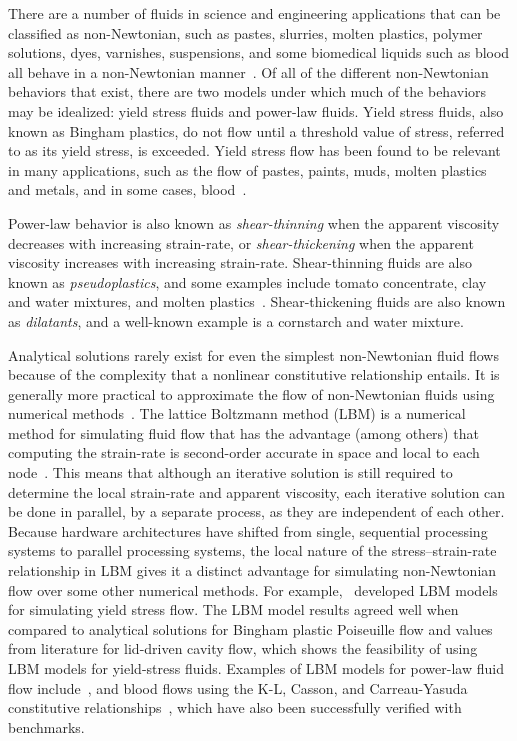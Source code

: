 There are a number of fluids in science and engineering applications that can be classified as non-Newtonian, such as pastes, slurries, molten plastics, polymer solutions, dyes, varnishes, suspensions, and some biomedical liquids such as blood all behave in a non-Newtonian manner~\cite{bohme1987non}.
Of all of the different non-Newtonian behaviors that exist, there are two models under which much of the behaviors may be idealized: yield stress fluids and power-law fluids.
Yield stress fluids, also known as Bingham plastics, do not flow until a threshold value of stress, referred to as its yield stress, is exceeded.
Yield stress flow has been found to be relevant in many applications, such as the flow of pastes, paints, muds, molten plastics and metals, and in some cases, blood~\cite{wang2011lattice}.

Power-law behavior is also known as \emph{shear-thinning} when the apparent viscosity decreases with increasing strain-rate, or \emph{shear-thickening} when the apparent viscosity increases with increasing strain-rate.
Shear-thinning fluids are also known as \emph{pseudoplastics}, and some examples include tomato concentrate, clay and water mixtures, and molten plastics~\cite{irgens2014rheology}.
Shear-thickening fluids are also known as \emph{dilatants}, and a well-known example is a cornstarch and water mixture.

\label{sec:lbm-for-nnf}

Analytical solutions rarely exist for even the simplest non-Newtonian fluid flows because of the complexity that a nonlinear constitutive relationship entails.
It is generally more practical to approximate the flow of non-Newtonian fluids using numerical methods~\cite{syrakos2014performance,owens2002computational,chai2011multiple}.
The lattice Boltzmann method (LBM) is a numerical method for simulating fluid flow that has the advantage (among others) that computing the strain-rate is second-order accurate in space and local to each node~\cite{kruger2010second}.
This means that although an iterative solution is still required to determine the local strain-rate and apparent viscosity, each iterative solution can be done in parallel, by a separate process, as they are independent of each other.
Because hardware architectures have shifted from single, sequential processing systems to parallel processing systems, the local nature of the stress--strain-rate relationship in LBM gives it a distinct advantage for simulating non-Newtonian flow over some other numerical methods.
For example,~\cite{tang2011bingham,chai2011multiple,fallah2012multiple,chen2014simulations,vikhansky2008lattice,wang2008lattice} developed LBM models for simulating yield stress flow.
The LBM model results agreed well when compared to analytical solutions for Bingham plastic Poiseuille flow and values from literature for lid-driven cavity flow, which shows the feasibility of using LBM models for yield-stress fluids.
Examples of LBM models for power-law fluid flow include~\cite{wang2011lattice,wang2015localized,boyd2006second,chai2011multiple}, and blood flows using the K-L, Casson, and Carreau-Yasuda constitutive relationships~\cite{ashrafizaadeh2009comparison}, which have also been successfully verified with benchmarks.

